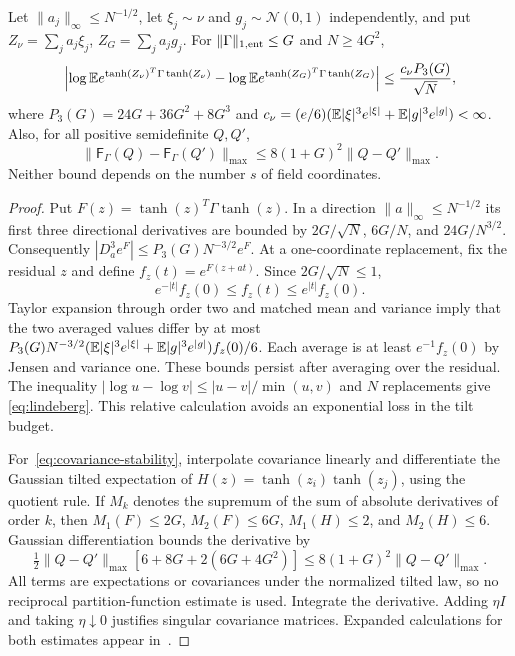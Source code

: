 \begin{lemma}
\label{lem:comparisons}
Let $\|a_j\|_\infty\leq N^{-1/2}$, let $\xi_j\sim\nu$ and
$g_j\sim\mathcal N(0,1)$ independently, and put
$Z_\nu=\sum_j a_j\xi_j$, $Z_G=\sum_j a_jg_j$.
For $\|\Gamma\|_{1,\rm ent}\leq G$ and $N\geq4G^2$,
\begin{equation}\label{eq:lindeberg}
 \left|\log\mathbb E e^{\tanh(Z_\nu)^T\Gamma\tanh(Z_\nu)}
      -\log\mathbb E e^{\tanh(Z_G)^T\Gamma\tanh(Z_G)}\right|
 \leq\frac{c_\nu P_3(G)}{\sqrt N},
\end{equation}
where $P_3(G)=24G+36G^2+8G^3$ and
$c_\nu=(e/6)(\mathbb E|\xi|^3e^{|\xi|}+\mathbb E|g|^3e^{|g|})<\infty$.
Also, for all positive semidefinite $Q,Q'$,
\begin{equation}\label{eq:covariance-stability}
 \|\mathsf F_\Gamma(Q)-\mathsf F_\Gamma(Q')\|_{\max}
 \leq8(1+G)^2\|Q-Q'\|_{\max}.
\end{equation}
Neither bound depends on the number $s$ of field coordinates.
\end{lemma}
\begin{proof}
Put $F(z)=\tanh(z)^T\Gamma\tanh(z)$. In a direction
$\|a\|_\infty\leq N^{-1/2}$ its first three directional derivatives
are bounded by $2G/\sqrt N$, $6G/N$, and $24G/N^{3/2}$.
Consequently $|D_a^3e^F|\leq P_3(G)N^{-3/2}e^F$.
At a one-coordinate replacement, fix the residual $z$ and define
$f_z(t)=e^{F(z+at)}$. Since $2G/\sqrt N\leq1$,
\[
 e^{-|t|}f_z(0)\leq f_z(t)\leq e^{|t|}f_z(0).
\]
Taylor expansion through order two and matched mean and variance imply
that the two averaged values differ by at most
$P_3(G)N^{-3/2}(\mathbb E|\xi|^3e^{|\xi|}+\mathbb E|g|^3e^{|g|})f_z(0)/6$.
Each average is at least $e^{-1}f_z(0)$ by Jensen and variance one.
These bounds persist after averaging over the residual. The inequality
$|\log u-\log v|\leq|u-v|/\min(u,v)$ and $N$ replacements give
\eqref{eq:lindeberg}. This relative calculation avoids an exponential
loss in the tilt budget.

For~\eqref{eq:covariance-stability}, interpolate covariance linearly
and differentiate the Gaussian tilted expectation of
$H(z)=\tanh(z_i)\tanh(z_j)$, using the quotient rule. If
$M_k$ denotes the supremum of the sum of absolute derivatives of order
$k$, then $M_1(F)\leq2G$, $M_2(F)\leq6G$,
$M_1(H)\leq2$, and $M_2(H)\leq6$. Gaussian differentiation bounds
the derivative by
\[
 \tfrac12\|Q-Q'\|_{\max}
       [6+8G+2(6G+4G^2)]
 \leq8(1+G)^2\|Q-Q'\|_{\max}.
\]
All terms are expectations or covariances under the normalized tilted
law, so no reciprocal partition-function estimate is used. Integrate
the derivative. Adding $\eta I$ and taking $\eta\downarrow0$
justifies singular covariance matrices. Expanded calculations for both
estimates appear in~\cite{nongaus}.
\end{proof}

